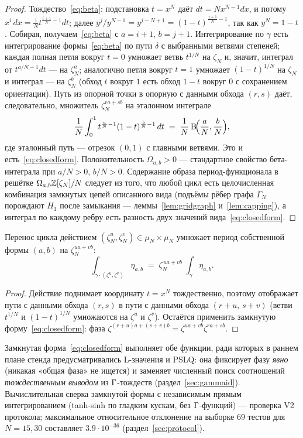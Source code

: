 \begin{proof}
Тождество~\eqref{eq:beta}: подстановка $t=x^N$ даёт $dt=Nx^{N-1}dx$,
и потому $x^i\,dx=\tfrac1N t^{\frac{i+1}{N}-1}dt$; далее
$y^j/y^{N-1}=y^{j-N+1}=(1-t)^{\frac{j+1}{N}-1}$, так как $y^N=1-t$.
Собирая, получаем~\eqref{eq:beta} с $a=i+1$, $b=j+1$. Интегрирование
по $\gamma$ есть интегрирование формы~\eqref{eq:beta} по пути
$\delta$ с выбранными ветвями степеней; каждая полная петля вокруг
$t=0$ умножает ветвь $t^{1/N}$ на $\zeta_N$ и, значит, интеграл от
$t^{a/N-1}dt$ --- на $\zeta_N^{a}$; аналогично петля вокруг $t=1$
умножает $(1-t)^{1/N}$ на $\zeta_N$ и интеграл --- на $\zeta_N^{b}$
(обход $t$ вокруг $1$ есть обход $1-t$ вокруг $0$ с сохранением
ориентации). Путь из опорной точки в опорную с данными обхода
$(r,s)$ даёт, следовательно, множитель $\zeta_N^{ra+sb}$ на
эталонном интеграле
\[
  \frac1N\int_0^1 t^{\frac{a}{N}-1}(1-t)^{\frac{b}{N}-1}\,dt
  \;=\;\frac1N\,\mathrm{B}\!\Bigl(\frac{a}{N},\frac{b}{N}\Bigr),
\]
где эталонный путь --- отрезок $(0,1)$ с главными ветвями. Это и
есть~\eqref{eq:closedform}. Положительность $\Omega_{a,b}>0$ ---
стандартное свойство бета-интеграла при $a/N>0$, $b/N>0$. Содержание
образа период-функционала в решётке $\Omega_{a,b}\mathbb{Z}[\zeta_N]/N$
следует из того, что любой цикл есть целочисленная комбинация
замкнутых цепей описанного вида (подъёмы рёбер графа $\Gamma_N$
порождают $H_1$ после замыкания --- леммы~\ref{lem:gridgraph}
и~\ref{lem:capping}), а интеграл по каждому ребру есть разность двух
значений вида~\eqref{eq:closedform}.
\end{proof}

\begin{corollary}\label{cor:equivar}
Перенос цикла действием $(\zeta_N^u,\zeta_N^v)\in\mu_N\times\mu_N$
умножает период собственной формы $(a,b)$ на $\zeta_N^{ua+vb}$:
\[
  \int_{\gamma\cdot(\zeta^u,\zeta^v)}\eta_{a,b}
  \;=\;\zeta_N^{\,ua+vb}\;\int_\gamma\eta_{a,b}.
\]
\end{corollary}

\begin{proof}
Действие поднимает координату $t=x^N$ тождественно, поэтому отображает
пути с данными обхода $(r,s)$ в пути с данными обхода
$(r+u,\,s+v)$ (ветви $t^{1/N}$ и $(1-t)^{1/N}$ умножаются на
$\zeta^u$ и $\zeta^v$). Остаётся применить замкнутую
форму~\eqref{eq:closedform}: фаза
$\zeta^{(r+u)a+(s+v)b}=\zeta^{ua+vb}\zeta^{ra+sb}$.
\end{proof}

\begin{remark}
Замкнутая форма~\eqref{eq:closedform} выполняет обе функции, ради
которых в раннем плане стенда предусматривались L-значения и PSLQ:
она фиксирует фазу \emph{явно} (никакая «общая фаза» не ищется) и
заменяет численный поиск соотношений \emph{тождественным выводом} из
$\Gamma$-тождеств (раздел~\ref{sec:gammaid}). Вычислительная сверка
замкнутой формы с независимым прямым интегрированием (tanh-sinh по
гладким кускам, без $\Gamma$-функций) --- проверка V2 протокола;
максимальное относительное отклонение на выборке $69$ тестов для
$N=15,30$ составляет $3.9\cdot10^{-36}$ (раздел~\ref{sec:protocol}).
\end{remark}

